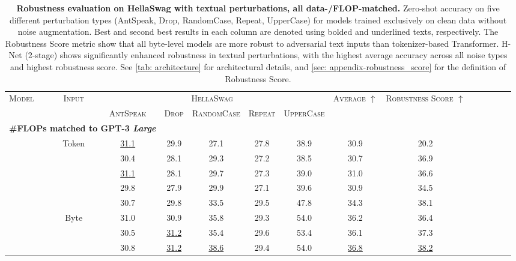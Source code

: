\documentclass{article}
\newcommand{\model}{H-Net}
\newcommand{\second}[1]{\underline{#1}}
\theoremstyle{plain}
\theoremstyle{remark}
\begin{document}
\begin{table}[t!]
\caption{
\textbf{Robustness evaluation on HellaSwag with textual perturbations, all data-/FLOP-matched.}
Zero-shot accuracy on five different perturbation types (AntSpeak, Drop, RandomCase, Repeat, UpperCase) for models trained exclusively on clean data without noise augmentation.
Best and second best results in each column are denoted using bolded and underlined texts, respectively.
The Robustness Score metric show that all byte-level models are more robust to adversarial text inputs than tokenizer-based Transformer.
\model{} (2-stage) shows significantly enhanced robustness in textual perturbations, with the highest average accuracy across all noise types and highest robustness score.
See \cref{tab: architecture} for architectural details, and \cref{sec: appendix-robustness_score} for the definition of Robustness Score.
}
\centering
\small
{ 
\begin{tabular}{lccccccccccccc} 
\toprule
\multirow{2}{*}{\textsc{Model}} & \multirow{2}{*}{\textsc{Input}} & \multicolumn{5}{c}{\textsc{HellaSwag}} & \multirow{2}{*}{\textsc{Average} $\uparrow$} & \multirowcell{2}{\textsc{Robustness}\\\textsc{Score} $\uparrow$}\\
\cmidrule{3-7}
 & & \textsc{AntSpeak} & \textsc{Drop} & \textsc{RandomCase} & \textsc{Repeat} & \textsc{UpperCase}\\
\midrule
\multicolumn{3}{l}{\quad \textbf{\#FLOPs matched to GPT-3 \textit{Large}}}\\
\cellcolor{Gray7!20}{Transformer} & Token & \second{31.1} & 29.9 & 27.1 & 27.8 & 38.9 & 30.9 & 20.2\\
\addlinespace[-0.15em]
\cmidrule{1-9}
\addlinespace[-0.25em]
\cellcolor{Grape7!10}{LlamaByte (W1024)} & & 30.4 & 28.1 & 29.3 & 27.2 & 38.5 & 30.7 & 36.9\\
\cellcolor{Violet7!10}{LlamaByte (Global)} & & \second{31.1} & 28.1 & 29.7 & 27.3 & 39.0 & 31.0 & 36.6\\
\cellcolor{Blue7!10}{MambaByte} & & 29.8 & 27.9 & 29.9 & 27.1 & 39.6 & 30.9 & 34.5\\
\cellcolor{Cyan7!10}{SpaceByte} & & 30.7 & 29.8 & 33.5 & 29.5 & 47.8 & 34.3 & 38.1\\
\cellcolor{Cyan7!10}{SpaceByte++} & Byte & 31.0 & 30.9 & 35.8 & 29.3 & 54.0 & 36.2 & 36.4\\
\cellcolor{Green7!10}{H-Net (pool)} & & 30.5 & \second{31.2} & 35.4 & 29.6 & 53.4 & 36.1 & 37.3\\
\cellcolor{Green7!10}{H-Net (space)} & & 30.8 & \second{31.2} & \second{38.6} & 29.4 & 54.0 & \second{36.8} & \second{38.2}\\

\end{tabular}}
\end{table}
\end{document}
